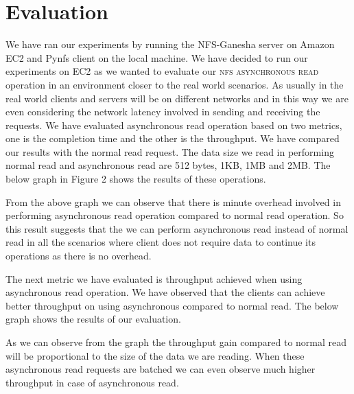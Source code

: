 \section{Evaluation}

	We have ran our experiments by running the NFS-Ganesha server on Amazon EC2 and Pynfs client on the local machine. We have decided to run our experiments on EC2 as we wanted to evaluate our \textsc{nfs asynchronous read} operation in an environment closer to the real world scenarios. As usually in the real world clients and servers will be on different networks and in this way we are even considering the network latency involved in sending and receiving the requests. We have evaluated asynchronous read operation based on two metrics, one is the completion time and the other is the throughput. We have compared our results with the normal read request. The data size we read in performing normal read and asynchronous read are 512 bytes, 1KB, 1MB and 2MB. The below graph in Figure 2 shows the results of these operations.
	

	From the above graph we can observe that there is minute overhead involved in performing asynchronous read operation compared to normal read operation. So this result suggests that the  we can perform asynchronous read instead of normal read in all the scenarios where client does not  require data to continue its operations as there is no overhead. 

	The next metric we have evaluated is throughput achieved when using asynchronous read operation. We have observed that the clients can achieve better throughput on using asynchronous compared to normal read. The below graph shows the results of our evaluation.


	As we can observe from the graph the throughput gain compared to normal read will be proportional to the size of the data we are reading. When these asynchronous read requests are batched we can even observe much higher throughput in case of asynchronous read.  

